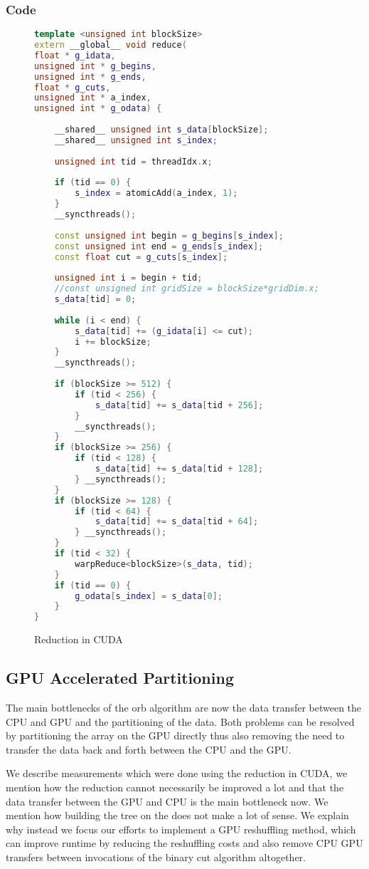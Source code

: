 \documentclass[]{article}
\begin{document}
\subsubsection{Code}

\begin{figure}[H]
	\begin{lstlisting}[language=c++]
template <unsigned int blockSize>
extern __global__ void reduce(
float * g_idata,
unsigned int * g_begins,
unsigned int * g_ends,
float * g_cuts,
unsigned int * a_index,
unsigned int * g_odata) {
	
	__shared__ unsigned int s_data[blockSize];
	__shared__ unsigned int s_index;
	
	unsigned int tid = threadIdx.x;
	
	if (tid == 0) {
		s_index = atomicAdd(a_index, 1);
	}
	__syncthreads();
	
	const unsigned int begin = g_begins[s_index];
	const unsigned int end = g_ends[s_index];
	const float cut = g_cuts[s_index];
	
	unsigned int i = begin + tid;
	//const unsigned int gridSize = blockSize*gridDim.x;
	s_data[tid] = 0;
	
	while (i < end) {
		s_data[tid] += (g_idata[i] <= cut);
		i += blockSize;
	}
	__syncthreads();
	
	if (blockSize >= 512) {
		if (tid < 256) {
			s_data[tid] += s_data[tid + 256];
		}
		__syncthreads();
	}
	if (blockSize >= 256) {
		if (tid < 128) {
			s_data[tid] += s_data[tid + 128];
		} __syncthreads();
	}
	if (blockSize >= 128) {
		if (tid < 64) {
			s_data[tid] += s_data[tid + 64];
		} __syncthreads();
	}
	if (tid < 32) {
		warpReduce<blockSize>(s_data, tid);
	}
	if (tid == 0) {
		g_odata[s_index] = s_data[0];
	}
}
	\end{lstlisting}
	\caption{Reduction in CUDA}
	\label{cuda:reduction2}
\end{figure}

\subsection{GPU Accelerated Partitioning}

The main bottlenecks of the orb algorithm are now the data transfer between the CPU and GPU and the partitioning of the data. Both problems can be resolved by partitioning the array on the GPU directly thus also removing the need to transfer the data back and forth between the CPU and the GPU.

We describe measurements which were done using the reduction in CUDA, we mention how the reduction cannot necessarily be improved a lot and that the data transfer between the GPU and CPU is the main bottleneck now. We mention how building the tree on the does not make a lot of sense. We explain why instead we focus our efforts to implement a GPU reshuffling method, which can improve runtime by reducing the reshuffling costs and also remove CPU GPU transfers between invocations of the binary cut algorithm altogether. 
\end{document}

